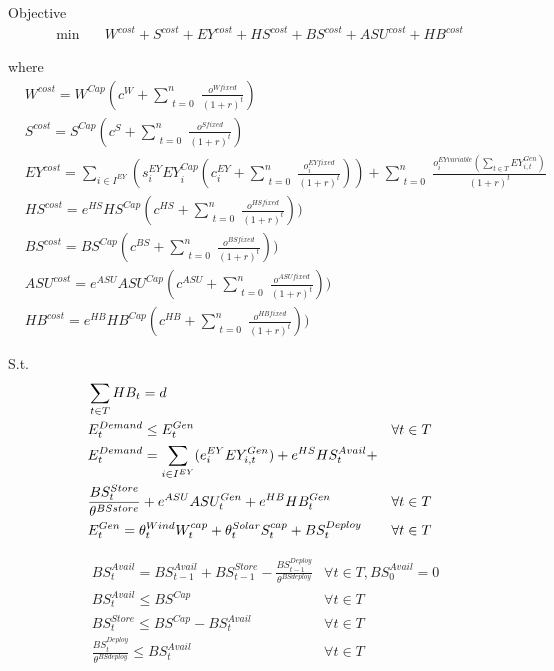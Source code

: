 \documentclass[12 pt]{article}
\begin{document}
Objective
\begin{align}
\min \quad
& W^{cost} + S^{cost} + EY^{cost} + HS^{cost} + BS^{cost} + ASU^{cost} + HB^{cost}
\end{align}




where
\begin{align}
& W^{cost} = W^{Cap}(c^{W} + \sum_{\substack{t = 0}}^n\frac{o^{W fixed}}{(1+r)^t} )\\
& S^{cost} = S^{Cap}(c^{S} + \sum_{\substack{t = 0}}^n\frac{o^{S fixed}}{(1+r)^t} )\\
& EY^{cost} = \sum_{i \in I^{EY}}(s^{EY}_{i}EY^{Cap}_{i}(c^{EY}_{i} + \sum_{\substack{t = 0}}^n\frac{o^{EY fixed}_{i}}{(1+r)^t} )) + \sum_{\substack{t = 0}}^n\frac{o^{EY variable}_{i}(\sum_{t \in T}EY^{Gen}_{i,t})}{(1+r)^t}\\
& HS^{cost} = e^{HS}HS^{Cap}(c^{HS} + \sum_{\substack{t = 0}}^n\frac{o^{HS fixed}}{(1+r)^t} ))\\
& BS^{cost} = BS^{Cap}(c^{BS} + \sum_{\substack{t = 0}}^n\frac{o^{BS fixed}}{(1+r)^t} ))\\
& ASU^{cost} = e^{ASU}ASU^{Cap}(c^{ASU} + \sum_{\substack{t = 0}}^n\frac{o^{ASU fixed}}{(1+r)^t} ))\\
& HB^{cost} = e^{HB}HB^{Cap}(c^{HB} + \sum_{\substack{t = 0}}^n\frac{o^{HB fixed}}{(1+r)^t} ))
\end{align}

S.t.
\begin{align}
& \sum_{t\in T}HB_{t} = d \\
& E^{Demand}_{t} \leq E^{Gen}_t & \forall t \in T \\
& E^{Demand}_{t} = \sum_{i \in I^{EY}}(e^{EY}_{i}EY^{Gen}_{i,t}) + e^{HS}HS^{Avail}_{t} + \notag\\
& \frac{BS^{Store}_{t}}{\theta^{BSstore}} + e^{ASU}ASU^{Gen}_{t} + e^{HB}HB^{Gen}_{t} &\forall t \in T \\
& E^{Gen}_{t} = \theta^{Wind}_{t}W^{cap}_{t} + \theta^{Solar}_{t}S^{cap}_{t} + BS^{Deploy}_{t} & \forall t \in T
\end{align}


\begin{align}
& BS^{Avail}_{t} = BS^{Avail}_{t-1} + BS^{Store}_{t-1} - \frac{BS^{Deploy}_{t-1}}{\theta^{BSdeploy}} & \forall t \in T,BS^{Avail}_{0} = 0 \\
& BS^{Avail}_{t} \leq BS^{Cap} & \forall t \in T \\
& BS^{Store}_{t} \leq BS^{Cap}-BS^{Avail}_{t} & \forall t \in T \\
&  \frac{BS^{Deploy}_{t}}{\theta^{BSdeploy}} \leq BS^{Avail}_{t} & \forall t \in T
\end{align}
\end{document}
